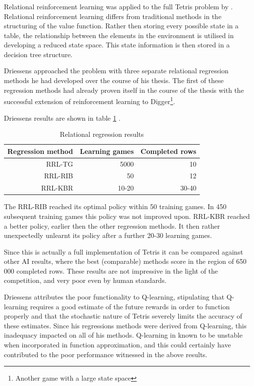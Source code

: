 \documentclass{rucsthesis}
\begin{document}
\subsubsection{\cite{kurt}}

Relational reinforcement learning was applied to the full Tetris problem by \cite{kurt}. Relational reinforcement learning differs from traditional methods in the structuring of the value function. Rather then storing every possible state in a table, the relationship between the elements in the environment is utilised in developing a reduced state space. This state information is then stored in a decision tree structure. 

Driessens approached the problem with three separate relational regression methods \citep{kurt} he had developed over the course of his thesis. The first of these regression methods had already proven itself in the course of the thesis with the successful extension of reinforcement learning to Digger\footnote{Another game with a large state space}. 

Driessens results are shown in table \ref{tbl:driessens} .

\begin{table}[h]
\centering
\begin{tabular}{|r|r|r|}
\hline
Regression method & Learning games & Completed rows  \\
\hline
RRL-TG	&	5000	& 	10   \\
\hline
RRL-RIB  &  50  & 12  \\
\hline
RRL-KBR  &  10-20  & 30-40  \\
\hline
\end{tabular}
\caption{Relational regression results \citep{kurt}}
\label{tbl:driessens}
\end{table}

The RRL-RIB reached its optimal policy within 50 training games. In 450 subsequent training games this policy was not improved upon. RRL-KBR reached a better policy, earlier then the other regression methods. It then rather unexpectedly unlearnt its policy after a further 20-30 learning games.

Since this is actually a full implementation of Tetris it can be compared against other AI results, where the best (comparable) methods score in the region of 650 000 completed rows\citep{tetstand}. These results are not impressive in the light of the competition, and very poor even by human standards. 

Driessens attributes the poor functionality to Q-learning, stipulating that Q-learning requires a good estimate of the future rewards in order to function properly and that the stochastic nature of Tetris severely limits the accuracy of these estimates. Since his regressions methods were derived from Q-learning, this inadequacy impacted on all of his methods. Q-learning in known to be unstable\citep[pg. 4]{keepaway,thrun93issues} when incorporated in function approximation, and this could certainly have contributed to the poor performance witnessed in the above results.
\end{document}
